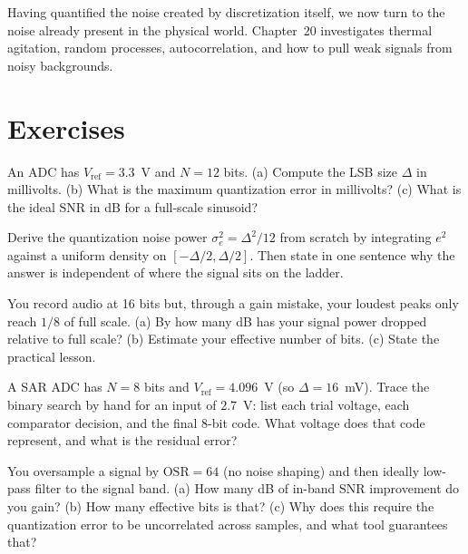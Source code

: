 Having quantified the noise created by discretization itself, we now turn to the noise already
present in the physical world. Chapter~20 investigates thermal agitation, random processes,
autocorrelation, and how to pull weak signals from noisy backgrounds.

\section{Exercises}
\label{ch19:exercises}

\begin{exercise}
An ADC has $V_{\mathrm{ref}}=3.3$~V and $N=12$ bits. (a) Compute the LSB size $\Delta$ in
millivolts. (b) What is the maximum quantization error in millivolts? (c) What is the ideal SNR in
dB for a full-scale sinusoid?
\end{exercise}

\begin{exercise}
Derive the quantization noise power $\sigma_e^2 = \Delta^2/12$ from scratch by integrating $e^2$
against a uniform density on $[-\Delta/2,\Delta/2]$. Then state in one sentence why the answer is
independent of where the signal sits on the ladder.
\end{exercise}

\begin{exercise}
You record audio at 16 bits but, through a gain mistake, your loudest peaks only reach
$1/8$ of full scale. (a) By how many dB has your signal power dropped relative to full scale?
(b) Estimate your effective number of bits. (c) State the practical lesson.
\end{exercise}

\begin{exercise}
A SAR ADC has $N=8$ bits and $V_{\mathrm{ref}}=4.096$~V (so $\Delta = 16$~mV). Trace the binary
search by hand for an input of $2.7$~V: list each trial voltage, each comparator decision, and the
final 8-bit code. What voltage does that code represent, and what is the residual error?
\end{exercise}

\begin{exercise}
You oversample a signal by $\mathrm{OSR}=64$ (no noise shaping) and then ideally low-pass filter
to the signal band. (a) How many dB of in-band SNR improvement do you gain? (b) How many effective
bits is that? (c) Why does this require the quantization error to be uncorrelated across samples,
and what tool guarantees that?
\end{exercise}

